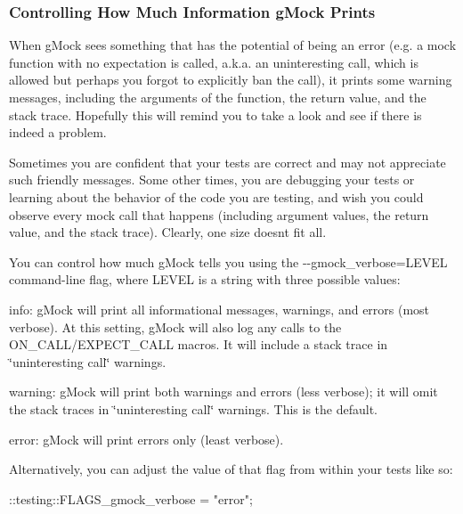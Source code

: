 \subsubsection*{Controlling How Much Information g\+Mock Prints}

When g\+Mock sees something that has the potential of being an error (e.\+g. a mock function with no expectation is called, a.\+k.\+a. an uninteresting call, which is allowed but perhaps you forgot to explicitly ban the call), it prints some warning messages, including the arguments of the function, the return value, and the stack trace. Hopefully this will remind you to take a look and see if there is indeed a problem.

Sometimes you are confident that your tests are correct and may not appreciate such friendly messages. Some other times, you are debugging your tests or learning about the behavior of the code you are testing, and wish you could observe every mock call that happens (including argument values, the return value, and the stack trace). Clearly, one size doesn\textquotesingle{}t fit all.

You can control how much g\+Mock tells you using the {\ttfamily -\/-\/gmock\+\_\+verbose=L\+E\+V\+EL} command-\/line flag, where {\ttfamily L\+E\+V\+EL} is a string with three possible values\+:


\begin{DoxyItemize}
\item {\ttfamily info}\+: g\+Mock will print all informational messages, warnings, and errors (most verbose). At this setting, g\+Mock will also log any calls to the {\ttfamily O\+N\+\_\+\+C\+A\+L\+L/\+E\+X\+P\+E\+C\+T\+\_\+\+C\+A\+LL} macros. It will include a stack trace in \char`\"{}uninteresting call\char`\"{} warnings.
\item {\ttfamily warning}\+: g\+Mock will print both warnings and errors (less verbose); it will omit the stack traces in \char`\"{}uninteresting call\char`\"{} warnings. This is the default.
\item {\ttfamily error}\+: g\+Mock will print errors only (least verbose).
\end{DoxyItemize}

Alternatively, you can adjust the value of that flag from within your tests like so\+:


\begin{DoxyCode}
::testing::FLAGS\_gmock\_verbose = \textcolor{stringliteral}{"error"};
\end{DoxyCode}



